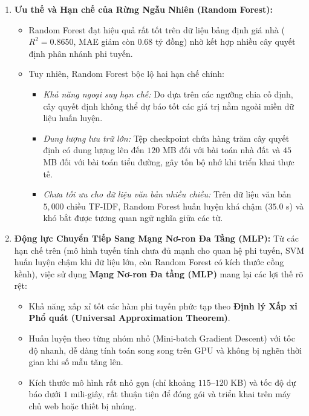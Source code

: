 \documentclass[12pt,a4paper]{report}
\begin{document}
\begin{enumerate}[leftmargin=1.2cm]
\begin{itemize}
    \end{itemize}
    \item \textbf{Ưu thế và Hạn chế của Rừng Ngẫu Nhiên (Random Forest):}
    \begin{itemize}
        \item Random Forest đạt hiệu quả rất tốt trên dữ liệu bảng định giá nhà ($R^2 = 0.8650$, MAE giảm còn $0.68$ tỷ đồng) nhờ kết hợp nhiều cây quyết định phân nhánh phi tuyến.
        \item Tuy nhiên, Random Forest bộc lộ hai hạn chế chính:
        \begin{itemize}
            \item \textit{Khả năng ngoại suy hạn chế:} Do dựa trên các ngưỡng chia cố định, cây quyết định không thể dự báo tốt các giá trị nằm ngoài miền dữ liệu huấn luyện.
            \item \textit{Dung lượng lưu trữ lớn:} Tệp checkpoint chứa hàng trăm cây quyết định có dung lượng lên đến $120$ MB đối với bài toán nhà đất và $45$ MB đối với bài toán tiểu đường, gây tốn bộ nhớ khi triển khai thực tế.
            \item \textit{Chưa tối ưu cho dữ liệu văn bản nhiều chiều:} Trên dữ liệu văn bản $5,000$ chiều TF-IDF, Random Forest huấn luyện khá chậm ($35.0$ s) và khó bắt được tương quan ngữ nghĩa giữa các từ.
        \end{itemize}
    \end{itemize}
    \item \textbf{Động lực Chuyển Tiếp Sang Mạng Nơ-ron Đa Tầng (MLP):}
    Từ các hạn chế trên (mô hình tuyến tính chưa đủ mạnh cho quan hệ phi tuyến, SVM huấn luyện chậm khi dữ liệu lớn, còn Random Forest có kích thước cồng kềnh), việc sử dụng \textbf{Mạng Nơ-ron Đa tầng (MLP)} mang lại các lợi thế rõ rệt:
    \begin{itemize}
        \item Khả năng xấp xỉ tốt các hàm phi tuyến phức tạp theo \textbf{Định lý Xấp xỉ Phổ quát (Universal Approximation Theorem)}.
        \item Huấn luyện theo từng nhóm nhỏ (Mini-batch Gradient Descent) với tốc độ nhanh, dễ dàng tính toán song song trên GPU và không bị nghẽn thời gian khi số mẫu tăng lên.
        \item Kích thước mô hình rất nhỏ gọn (chỉ khoảng $115$--$120$ KB) và tốc độ dự báo dưới $1$ mili-giây, rất thuận tiện để đóng gói và triển khai trên máy chủ web hoặc thiết bị nhúng.
    \end{itemize}
\end{enumerate}
\end{document}
